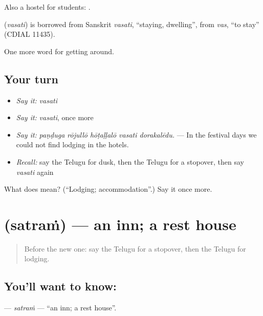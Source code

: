 Also a hostel for students:   .

\begin{cousinweb}
\textbf{} (\emph{vasati}) is borrowed from Sanskrit \emph{vasati}, \textquotedblleft{}staying, dwelling\textquotedblright{}, from \emph{vas}, \textquotedblleft{}to stay\textquotedblright{} (CDIAL 11435).
\end{cousinweb}

\begin{grammarlens}[title={What you've built}]
One more word for getting around.
\end{grammarlens}

\subsection*{Your turn}
\begin{itemize}
\raggedright
  \item \emph{Say it:} \emph{vasati}
  \item \emph{Say it:} \emph{vasati}, once more
  \item \emph{Say it:} \emph{paṇḍuga rōjullō hōṭaḷḷalō vasati dorakalēdu.} — In the festival days we could not find lodging in the hotels.
  \item \emph{Recall:} say the Telugu for dusk, then the Telugu for a stopover, then say \emph{vasati} again
\end{itemize}

\begin{tcolorbox}[breakable,colback=teal!4,colframe=teal!35!black,title={Before you move on}]
What does  mean? (\textquotedblleft{}Lodging; accommodation\textquotedblright{}.) Say it once more.
\end{tcolorbox}
\section[\texorpdfstring{\te{సత్రం} (satraṁ)}{సత్రం (satraṁ)}]{ (satraṁ) — an inn; a rest house}

\label{lesson:TE-C457-satram}



\begin{quote}
Before the new one: say the Telugu for a stopover, then the Telugu for lodging.
\end{quote}

\subsection*{You'll want to know: }
\textbf{} — \emph{satraṁ} — \textquotedblleft{}an inn; a rest house\textquotedblright{}.

